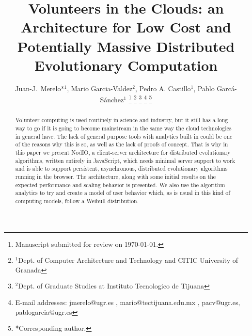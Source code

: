 \documentclass[journal,onecolumn]{IEEEtran}
\begin{document}
\title{Volunteers in the Clouds: an Architecture for Low Cost and Potentially Massive Distributed Evolutionary Computation}
%
%
%





\author{Juan-J.~Merelo*$^1$, Mario Garcia-Valdez$^2$, Pedro A. Castillo$^1$, Pablo Garc\'a-S\'anchez$^1$
\thanks{Manuscript submitted for review on \today.}%
\thanks{$^1$Dept. of Computer Architecture and Technology and CITIC University of Granada}%
\thanks{$^2$Dept. of Graduate Studies at Instituto Tecnologico de Tijuana}%
\thanks{E-mail addresses: jmerelo@ugr.es , mario@tectijuana.edu.mx , pacv@ugr.es, pablogarcia@ugr.es}%
\thanks{*Corresponding author.}%
}

\maketitle

\begin{abstract}
Volunteer computing is used routinely in science and industry, but it
still has a long way to go if it is going to become mainstream in the
same way the cloud technologies in general have. The lack of general purpose tools
with analytics built in could be one of the reasons why this is so, as
well as the lack of proofs of concept. That is why in this paper we
present NodIO, a client-server architecture for distributed
evolutionary algorithms, written entirely in JavaScript, which needs
minimal server support to work and is able to support persistent,
asynchronous, distributed evolutionary algorithms running in the
browser. The architecture, along with some initial results on the expected performance and scaling
behavior is presented. We also use the algorithm analytics to try and  %
create a model of user behavior which, as is usual in this kind of
computing models, follow a Weibull distribution. 
\end{abstract}
\end{document}
